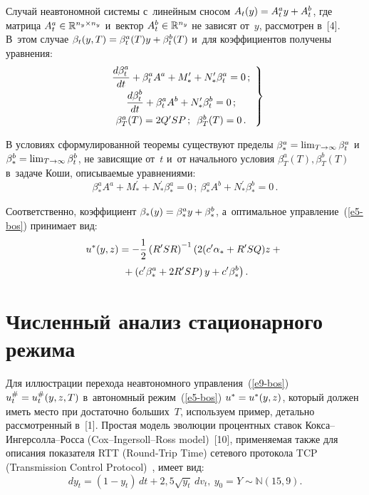 \begin{multicols}{2}
     Случай неавтономной сис\-те\-мы с~линейным сносом $A_t(y)\hm= A_t^a 
y\hm+ A_t^b$, где мат\-ри\-ца $A_t^a\hm\in \mathbb{R}^{n_y\times n_y}$ и~вектор $A_t^b\hm\in \mathbb{R}^{n_y}$ не зависят от~$y$, рас\-смот\-рен в~[4]. 
В~этом случае $\beta_t(y,T)\hm= \beta_t^a(T)y \hm+ \beta_t^b(T)$ и~для 
коэффициентов получены уравнения:
     \begin{equation}
     \left.
     \begin{array}{c}
     \displaystyle\frac{\displaystyle d\beta_t^a\mathstrut}{\displaystyle dt\mathstrut} +\beta_t^a A^a +M^\prime_* +N^\prime_* \beta_t^a 
=0\,;\\[3pt]
     \displaystyle\frac{\displaystyle d\beta_t^b\mathstrut}{\displaystyle dt\mathstrut} +\beta_t^a A^b +N^\prime_* \beta_t^b=0\,;\\[3pt]
     \beta_T^a(T) =2Q^\prime SP\,;\enskip \beta_T^b(T)=0\,.
     \end{array}
     \right\}
     \label{e13-bos}
     \end{equation}
     
     В условиях сформулированной тео\-ре\-мы существуют пределы 
$\beta_*^a\hm= \lim_{T\to\infty} \beta_t^a$ и~$\beta_*^b\hm= \lim_{T\to \infty} 
\beta_t^b$, не зависящие от~$t$ и~от начального условия $\beta_T^a(T), 
\beta_T^b(T)$ в~задаче Коши, опи\-сы\-ва\-емые уравнениями:
     \begin{equation}
     \beta_*^a A^a +M^\prime_* +N^\prime_* \beta_*^a =0\,;\
     \beta_*^a A^b +N^\prime_* \beta_*^b=0\,.
     \label{e14-bos}
     \end{equation}
     
     Соответственно, коэффициент $\beta_*(y)\hm= \beta_*^a y \hm+ 
\beta_*^b$, а~оптимальное управ\-ле\-ние~(\ref{e5-bos}) принимает вид:
     \begin{multline}
     u^*(y,z) =-\displaystyle\frac{\displaystyle 1\mathstrut}{\displaystyle 2\mathstrut}\left( R^\prime SR\right)^{-1} \left(2(c^\prime \alpha_* 
+R^\prime SQ)z +{}\right.\\
\left.{}+\left(c^\prime \beta_*^a +2R^\prime SP\right)y +c^\prime 
\beta_*^b\right).
     \label{e15-bos}
     \end{multline}
     
     \vspace*{-6pt}

\section{Численный анализ стационарного режима}

     Для иллюстрации перехода неавтономного управ\-ле\-ния~(\ref{e9-bos}) 
$u_t^\#\hm= u_t^\# (y,z,T)$ в~автономный режим~(\ref{e5-bos}) $u^*\hm= 
u^*(y,z)$, который должен иметь мес\-то при достаточно больших~$T$, 
используем пример, детально рас\-смот\-рен\-ный в~[1]. Простая модель 
эволюции процентных ставок Кок\-са--Ин\-гер\-сол\-ла--Рос\-са  
(Cox--Ingersoll--Ross model)~[10], при\-ме\-ня\-емая так\-же для описания 
показателя RTT (Round-Trip Time) сетевого протокола TCP (Transmission 
Control Protocol)~\cite{11-bos}, имеет вид:
     \begin{equation}
     dy_t=(1-y_t)\,dt+2{,}5\sqrt{y_t}\,dv_t,\ y_0=Y\sim \mathbb{N}(15{,}9). \!
     \label{e16-bos}
     \end{equation}
     

\end{multicols}
